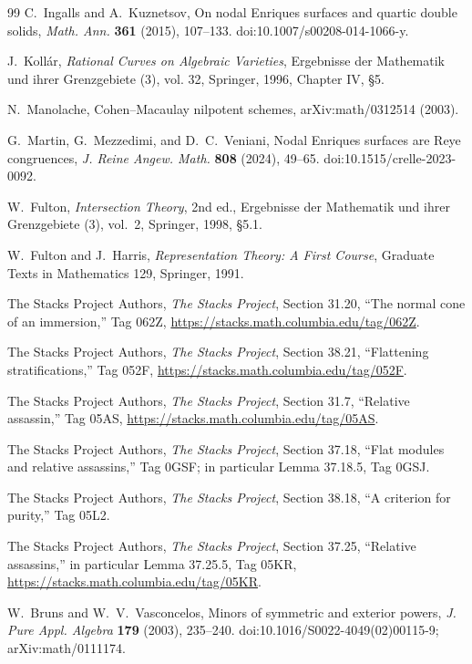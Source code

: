 \begin{thebibliography}{99}
C.~Ingalls and A.~Kuznetsov,
On nodal Enriques surfaces and quartic double solids,
\emph{Math. Ann.} \textbf{361} (2015), 107--133.
doi:10.1007/s00208-014-1066-y.

J.~Koll\'ar,
\emph{Rational Curves on Algebraic Varieties},
Ergebnisse der Mathematik und ihrer Grenzgebiete (3), vol. 32,
Springer, 1996, Chapter IV, \S5.

N.~Manolache,
Cohen--Macaulay nilpotent schemes,
arXiv:math/0312514 (2003).

G.~Martin, G.~Mezzedimi, and D.~C.~Veniani,
Nodal Enriques surfaces are Reye congruences,
\emph{J. Reine Angew. Math.} \textbf{808} (2024), 49--65.
doi:10.1515/crelle-2023-0092.


W.~Fulton,
\emph{Intersection Theory}, 2nd ed.,
Ergebnisse der Mathematik und ihrer Grenzgebiete (3), vol.~2,
Springer, 1998, \S5.1.

W.~Fulton and J.~Harris,
\emph{Representation Theory: A First Course},
Graduate Texts in Mathematics 129, Springer, 1991.

The Stacks Project Authors,
\emph{The Stacks Project}, Section 31.20,
``The normal cone of an immersion,'' Tag 062Z,
\url{https://stacks.math.columbia.edu/tag/062Z}.

The Stacks Project Authors,
\emph{The Stacks Project}, Section 38.21,
``Flattening stratifications,'' Tag 052F,
\url{https://stacks.math.columbia.edu/tag/052F}.

The Stacks Project Authors,
\emph{The Stacks Project}, Section 31.7,
``Relative assassin,'' Tag 05AS,
\url{https://stacks.math.columbia.edu/tag/05AS}.

The Stacks Project Authors,
\emph{The Stacks Project}, Section 37.18,
``Flat modules and relative assassins,'' Tag 0GSF;
in particular Lemma 37.18.5, Tag 0GSJ.

The Stacks Project Authors,
\emph{The Stacks Project}, Section 38.18,
``A criterion for purity,'' Tag 05L2.

The Stacks Project Authors,
\emph{The Stacks Project}, Section 37.25,
``Relative assassins,'' in particular Lemma 37.25.5, Tag 05KR,
\url{https://stacks.math.columbia.edu/tag/05KR}.

W.~Bruns and W.~V.~Vasconcelos,
Minors of symmetric and exterior powers,
\emph{J. Pure Appl. Algebra} \textbf{179} (2003), 235--240.
doi:10.1016/S0022-4049(02)00115-9; arXiv:math/0111174.


\end{thebibliography}
